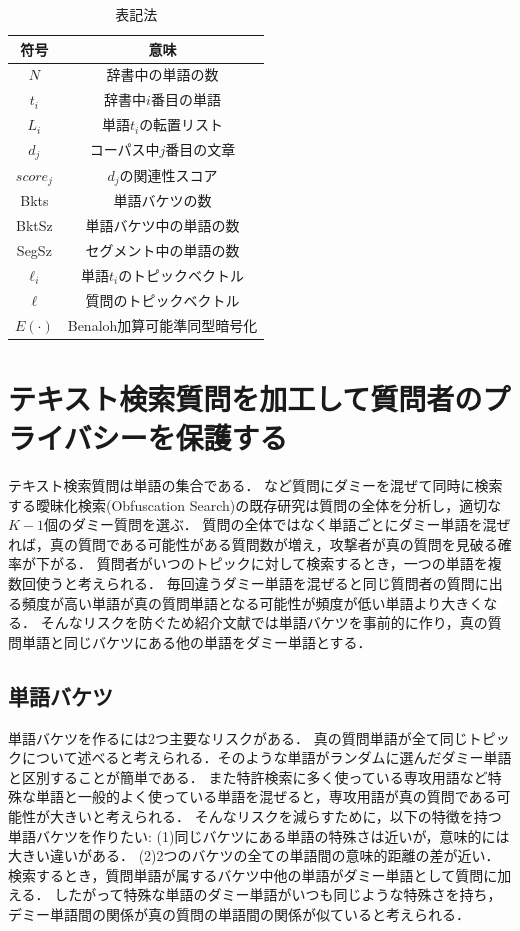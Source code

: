 \documentclass{jsarticle}
\theoremstyle{definition}
\begin{document}
\begin{table}[!hbp]
\center
\begin{tabular}{|c|c|}
\hline
符号 & 意味 \\
\hline
$N$ & 辞書中の単語の数 \\
$t_i$ & 辞書中$i$番目の単語 \\
$L_i$ & 単語$t_i$の転置リスト \\
$d_j$ & コーパス中$j$番目の文章 \\
$score_j$ & $d_j$の関連性スコア \\
Bkts & 単語バケツの数 \\
BktSz & 単語バケツ中の単語の数 \\
SegSz & セグメント中の単語の数 \\
$\ell_i$ & 単語$t_i$のトピックベクトル \\
$\ell$ & 質問のトピックベクトル \\
$E(\cdot)$ & Benaloh加算可能準同型暗号化 \\
\hline
\end{tabular}
\caption{表記法}
\end{table}

\section{テキスト検索質問を加工して質問者のプライバシーを保護する}
テキスト検索質問は単語の集合である．
\cite{murugesan_providing_2009}など質問にダミーを混ぜて同時に検索する曖昧化検索(Obfuscation Search)の既存研究は質問の全体を分析し，適切な$K-1$個のダミー質問を選ぶ．
質問の全体ではなく単語ごとにダミー単語を混ぜれば，真の質問である可能性がある質問数が増え，攻撃者が真の質問を見破る確率が下がる．
質問者がいつのトピックに対して検索するとき，一つの単語を複数回使うと考えられる．
毎回違うダミー単語を混ぜると同じ質問者の質問に出る頻度が高い単語が真の質問単語となる可能性が頻度が低い単語より大きくなる．
そんなリスクを防ぐため紹介文献では単語バケツを事前的に作り，真の質問単語と同じバケツにある他の単語をダミー単語とする．

\subsection{単語バケツ}
単語バケツを作るには2つ主要なリスクがある．
真の質問単語が全て同じトピックについて述べると考えられる．そのような単語がランダムに選んだダミー単語と区別することが簡単である．
また特許検索に多く使っている専攻用語など特殊な単語と一般的よく使っている単語を混ぜると，専攻用語が真の質問である可能性が大きいと考えられる．
そんなリスクを減らすために，以下の特徴を持つ単語バケツを作りたい:
(1)同じバケツにある単語の特殊さは近いが，意味的には大きい違いがある．
(2)2つのバケツの全ての単語間の意味的距離の差が近い．
\label{risk}
検索するとき，質問単語が属するバケツ中他の単語がダミー単語として質問に加える．
したがって特殊な単語のダミー単語がいつも同じような特殊さを持ち，デミー単語間の関係が真の質問の単語間の関係が似ていると考えられる．
\end{document}
